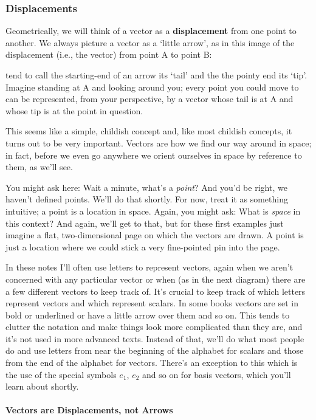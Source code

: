 \documentclass[oneside,english]{amsbook}
\numberwithin{section}{chapter}
\theoremstyle{plain}
\theoremstyle{definition}
\begin{document}
\subsubsection{Displacements}

Geometrically, we will think of a vector as a \textbf{displacement} from
one point to another. We always picture a vector as a `little arrow',
as in this image of the displacement (i.e., the vector) from point A to
point B:

tend to call the starting-end of an arrow its `tail' and the the
pointy end its `tip'. Imagine standing at A and looking around you;
every point you could move to can be represented, from your perspective,
by a vector whose tail is at A and whose tip is at the point in
question.

This seems like a simple, childish concept and, like most childish
concepts, it turns out to be very important. Vectors are how we find our
way around in space; in fact, before we even go anywhere we orient
ourselves in space by reference to them, as we'll see.

You might ask here: Wait a minute, what's a \emph{point}? And you'd be
right, we haven't defined points. We'll do that shortly. For now, treat
it as something intuitive; a point is a location in space. Again, you
might ask: What is \emph{space} in this context? And again, we'll get to
that, but for these first examples just imagine a flat, two-dimensional
page on which the vectors are drawn. A point is just a location where we
could stick a very fine-pointed pin into the page.

In these notes I'll often use letters to represent vectors, again when
we aren't concerned with any particular vector or when (as in the next
diagram) there are a few different vectors to keep track of. It's crucial to keep track of which letters represent vectors and which represent scalars. In some books vectors are set in bold or underlined or have a little arrow over them and so on. This tends to clutter the notation and make things look more complicated than they are, and it's not used in more advanced texts. Instead of that, we'll do what most people do and use letters from near the beginning of the alphabet for scalars and those from the end of the alphabet for vectors. There's an exception to this which is the use of the special symbols $e_1$, $e_2$ and so on for basis vectors, which you'll learn about shortly.

\paragraph{Vectors are Displacements, not Arrows}
\end{document}
